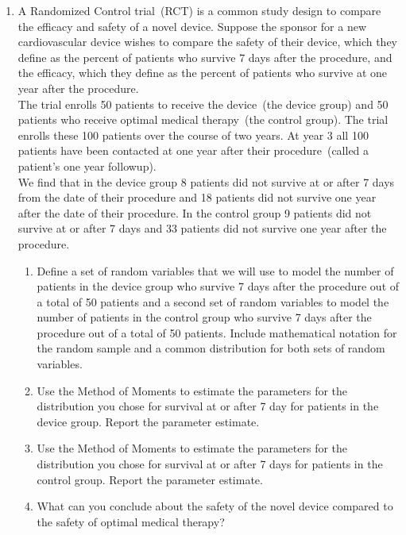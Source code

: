 \begin{enumerate}
    \item A Randomized Control trial~(RCT) is a common study design to compare the efficacy and safety of a novel device. Suppose the sponsor for a new cardiovascular device wishes to compare the safety of their device, which they define as the percent of patients who survive 7 days after the procedure, and the efficacy, which they define as the percent of patients who survive at one year after the procedure. \\ 
    
    The trial enrolls 50 patients to receive the device~(the device group) and 50 patients who receive optimal medical therapy~(the control group). The trial enrolls these 100 patients over the course of two years. At year 3 all 100 patients have been contacted at one year after their procedure~(called a patient's one year followup).\\
    
    We find that in the device group 8 patients did not survive at or after 7 days from the date of their procedure and 18 patients did not survive one year after the date of their procedure. In the control group 9 patients did not survive at or after 7 days and 33 patients did not survive one year after the procedure.
    
    \begin{enumerate}
        \item Define a set of random variables that we will use to model the number of patients in the device group who survive 7 days after the procedure out of a total of 50 patients and a second set of random variables to model the number of patients in the control group who survive 7 days after the procedure out of a total of 50 patients. Include mathematical notation for the random sample and a common distribution for both sets of random variables. 
        
        \item Use the Method of Moments to estimate the parameters for the distribution you chose for survival at or after 7 day for patients in the device group. Report the parameter estimate. 
        
        \item Use the Method of Moments to estimate the parameters for the distribution you chose for survival at or after 7 days for patients in the control group. Report the parameter estimate. 
        
        \item What can you conclude about the safety of the novel device compared to the safety of optimal medical therapy?  
        

\end{enumerate}
\end{enumerate}
